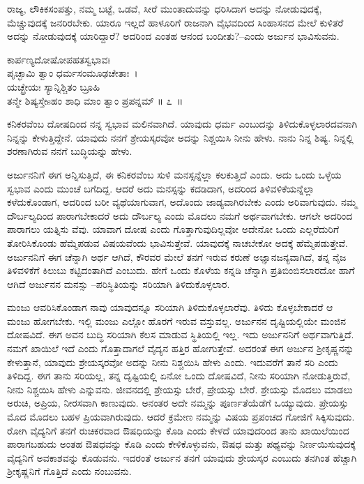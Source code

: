 ರಾಜ್ಯ, ಲೌಕಿಕಸಂಪತ್ತು, ನಮ್ಮ ಬಟ್ಟೆ, ಒಡವೆ, ಸೀರೆ ಮುಂತಾದುವನ್ನು ಧರಿಸಿದಾಗ ಅದನ್ನು ನೋಡುವುದಕ್ಕೆ, ಮೆಚ್ಚುವುದಕ್ಕೆ ಜನರಿರಬೇಕು. ಯಾರೂ ಇಲ್ಲದೆ ಹಾಳೂರಿಗೆ ರಾಜನಾಗಿ ವೈಭವದಿಂದ ಸಿಂಹಾಸನದ ಮೇಲೆ ಕುಳಿತರೆ ಅದನ್ನು ನೋಡುವುದಕ್ಕೆ ಯಾರಿದ್ದಾರೆ? ಅದರಿಂದ ಎಂತಹ ಆನಂದ ಬಂದೀತು?–ಎಂದು ಅರ್ಜುನ ಭಾವಿಸುವನು.

\begin{shloka}
ಕಾರ್ಪಣ್ಯದೋಷೋಪಹತಸ್ವಭಾವಃ\\ಪೃಚ್ಛಾಮಿ ತ್ವಾಂ ಧರ್ಮಸಂಮೂಢಚೇತಾಃ~।\\ಯಚ್ಛ್ರೇಯಃ ಸ್ಯಾನ್ನಿಶ್ಚಿತಂ ಬ್ರೂಹಿ\\ತನ್ಮೇ ಶಿಷ್ಯಸ್ತೇsಹಂ ಶಾಧಿ ಮಾಂ ತ್ವಾಂ ಪ್ರಪನ್ನಮ್ \hfill॥ ೭~॥
\end{shloka}

\begin{artha}
ಕನಿಕರವೆಂಬ ದೋಷದಿಂದ ನನ್ನ ಸ್ವಭಾವ ಮಲಿನವಾಗಿದೆ. ಯಾವುದು ಧರ್ಮ ಎಂಬುದನ್ನು ತಿಳಿದುಕೊಳ್ಳಲಾರದವನಾಗಿ ನಿನ್ನನ್ನು ಕೇಳುತ್ತಿದ್ದೇನೆ. ಯಾವುದು ನನಗೆ ಶ್ರೇಯಸ್ಕರವೋ ಅದನ್ನು ನಿಶ್ಚಯಿಸಿ ನೀನು ಹೇಳು. ನಾನು ನಿನ್ನ ಶಿಷ್ಯ. ನಿನ್ನಲ್ಲಿ ಶರಣಾಗಿರುವ ನನಗೆ ಬುದ್ಧಿಯನ್ನು ಹೇಳು.
\end{artha}

ಅರ್ಜುನನಿಗೆ ಈಗ ಅನ್ನಿಸುತ್ತಿದೆ, ಈ ಕನಿಕರವೆಂಬ ಸುಳಿ ಮನಸ್ಸನ್ನೆಲ್ಲಾ ಕಲಕುತ್ತಿದೆ ಎಂದು. ಅದು ಒಂದು ಒಳ್ಳೆಯ ಸ್ವಭಾವ ಎಂದು ಮುಂಚೆ ಬಗೆದಿದ್ದ. ಆದರೆ ಅದು ಮನಸ್ಸನ್ನು ಕದಡಿದಾಗ, ಅದರಿಂದ ತಿಳಿವಳಿಕೆಯನ್ನೆಲ್ಲಾ ಕಳೆದುಕೊಂಡಾಗ, ಅದರಿಂದ ಬರೀ ವ್ಯಥೆಯಾಗುವಾಗ, ಅದೊಂದು ಜಾಡ್ಯವಾಗಿರಬೇಕು ಎಂದು ಅರಿವಾಗುವುದು. ನಮ್ಮ ದೌರ್ಬಲ್ಯದಿಂದ ಪಾರಾಗಬೇಕಾದರೆ ಅದು ದೌರ್ಬಲ್ಯ ಎಂದು ಮೊದಲು ನಮಗೆ ಅರ್ಥವಾಗಬೇಕು. ಆಗಲೇ ಅದರಿಂದ ಪಾರಾಗಲು ಯತ್ನಿಸು ವೆವು. ಯಾವಾಗ ದೋಷ ಎಂದು ಗೊತ್ತಾಗುವುದಿಲ್ಲವೋ ಅದೇನೋ ಒಂದು ಎಲ್ಲರೆದುರಿಗೆ ತೋರಿಸಿಕೊಂಡು ಹೆಮ್ಮೆಪಡುವ ವಿಷಯವೆಂದು ಭಾವಿಸುತ್ತೇವೆ. ಯಾವುದಕ್ಕೆ ನಾಚಬೇಕೋ ಅದಕ್ಕೆ ಹೆಮ್ಮೆಪಡುತ್ತೇವೆ. ಅರ್ಜುನನಿಗೆ ಈಗ ಚೆನ್ನಾಗಿ ಅರ್ಥ ಆಗಿದೆ, ಕೌರವರ ಮೇಲೆ ತನಗೆ ಇರುವ ಕರುಣೆ ಅಜ್ಞಾನಜನ್ಯವಾಗಿದೆ, ತನ್ನ ನೈಜ ತಿಳಿವಳಿಕೆಗೆ ಕಿಲುಬು ಕಟ್ಟಿದಂತಾಗಿದೆ ಎಂಬುದು. ಹೇಗೆ ಒಂದು ಕೊಳೆಯ ಕನ್ನಡಿ ಚೆನ್ನಾಗಿ ಪ್ರತಿಬಿಂಬಿಸಲಾರದೋ ಹಾಗೆ ಆಗಿದೆ ಅರ್ಜುನನ ಮನಸ್ಸು –ಪರಿಸ್ಥಿತಿಯನ್ನು ಸರಿಯಾಗಿ ತಿಳಿದುಕೊಳ್ಳಲಾರ.

ಮಂಜು ಆವರಿಸಿಕೊಂಡಾಗ ನಾವು ಯಾವುದನ್ನೂ ಸರಿಯಾಗಿ ತಿಳಿದುಕೊಳ್ಳಲಾರೆವು. ತಿಳಿದು ಕೊಳ್ಳಬೇಕಾದರೆ ಆ ಮಂಜು ಹೋಗಬೇಕು. ಇಲ್ಲಿ ಮಂಜು ಎಲ್ಲೋ ಹೊರಗೆ ಇರುವ ವಸ್ತುವಲ್ಲ. ಅರ್ಜುನನ ದೃಷ್ಟಿಯಲ್ಲಿಯೇ ಮಂಜಿನ ದೋಷವಿದೆ. ಈಗ ಅವನ ಬುದ್ಧಿ ಸರಿಯಾಗಿ ಕೆಲಸ ಮಾಡುವ ಸ್ಥಿತಿಯಲ್ಲಿ ಇಲ್ಲ. ಇದು ಅರ್ಜುನನಿಗೆ ಅರ್ಥವಾಗುತ್ತಿದೆ. ನಮಗೆ ಖಾಯಿಲೆ ಇದೆ ಎಂದು ಗೊತ್ತಾದಾಗಲೆ ವೈದ್ಯನ ಹತ್ತಿರ ಹೋಗುತ್ತೇವೆ. ಅದರಂತೆ ಈಗ ಅರ್ಜುನ ಶ‍್ರೀಕೃಷ್ಣನನ್ನು ಕೇಳುತ್ತಾನೆ, ಯಾವುದು ಶ್ರೇಯಸ್ಕರವೋ ಅದನ್ನು ನೀನು ನಿಶ್ಚಯಿಸಿ ಹೇಳು ಎಂದು. ಇದುವರೆಗೆ ತಾನೆ ಸರಿ ಎಂದು ತಿಳಿದಿದ್ದ. ಈಗ ತಾನು ಸರಿಯಲ್ಲ, ತನ್ನ ದೃಷ್ಟಿಯಲ್ಲಿ ಏನೋ ಒಂದು ದೋಷವಿದೆ, ನೀನು ಸರಿಯಾಗಿ ನೋಡುತ್ತಿರುವೆ, ನೀನು ನಿಶ್ಚಯಿಸಿ ಹೇಳು ಎನ್ನುವನು. ಜೀವನದಲ್ಲಿ ಶ್ರೇಯಸ್ಸು ಬೇರೆ, ಪ್ರೇಯಸ್ಸು ಬೇರೆ. ಶ್ರೇಯಸ್ಸು ಮೊದಲು ಮಾಡಲು ಅರುಚಿ, ಅಪ್ರಿಯ, ನೀರಸವಾಗಿ ಕಾಣುವುದು. ಅನಂತರ ಅದೇ ನಮ್ಮನ್ನು ಪೂರ್ಣತೆಯೆಡೆಗೆ ಒಯ್ಯುವುದು. ಪ್ರೇಯಸ್ಸು ಮೊದ ಮೊದಲು ಬಹಳ ಪ್ರಿಯವಾಗಿರುವುದು. ಆದರೆ ಕ್ರಮೇಣ ನಮ್ಮನ್ನು ವಿಷಯ ಪ್ರಪಂಚದ ಗೋಜಿಗೆ ಸಿಕ್ಕಿಸುವುದು. ರೋಗಿ ವೈದ್ಯನಿಗೆ ತನಗೆ ರುಚಿಕರವಾದ ಔಷಧಿಯನ್ನು ಕೊಡಿ ಎಂದು ಕೇಳದೆ ಯಾವುದರಿಂದ ತಾನು ಖಾಯಿಲೆಯಿಂದ ಪಾರಾಗಬಹುದು ಅಂತಹ ಔಷಧವನ್ನು ಕೊಡಿ ಎಂದು ಕೇಳಿಕೊಳ್ಳುವನು, ಔಷಧ ಮತ್ತು ಪಥ್ಯವನ್ನು ನಿರ್ಣಯಿಸುವುದಕ್ಕೆ ವೈದ್ಯನಿಗೆ ಅವಕಾಶವನ್ನು ಕೊಡುವನು. ಇದರಂತೆ ಅರ್ಜುನ ತನಗೆ ಯಾವುದು ಶ್ರೇಯಸ್ಕರ ಎಂಬುದು ತನಗಿಂತ ಹೆಚ್ಚಾಗಿ ಶ‍್ರೀಕೃಷ್ಣನಿಗೆ ಗೊತ್ತಿದೆ ಎಂದು ನಂಬುವನು.

